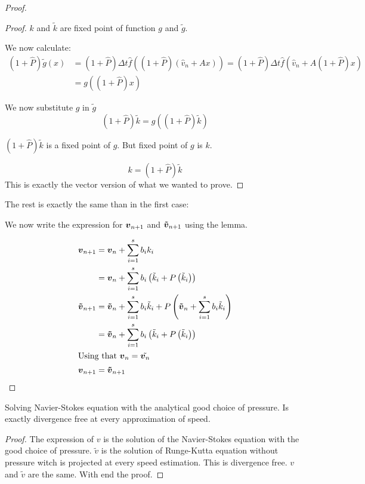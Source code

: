 \begin{proof}
\begin{proof}
$k$ and $\tilde{k}$ are fixed point of function $g$ and $\tilde{g}$.

We now calculate:
\begin{align}
(1+\hat{P})\tilde{g}(x)&=(1+\hat{P})\Delta t \hat{f}((1+\hat{P})(\hat{v}_{n}+Ax))=(1+\hat{P})\Delta t \hat{f}(\hat{v}_{n}+A (1+\hat{P})x)\\
&=g((1+\hat{P})x)
\end{align}

We now substitute $g$ in $\tilde{g}$
\begin{equation}
(1+\hat{P})\tilde{k}=g((1+\hat{P})\tilde{k})
\end{equation}

$(1+\hat{P})\tilde{k}$ is a fixed point of $g$.
But fixed point of $g$ is $k$.

\begin{equation}
k=(1+\hat{P})\tilde{k}
\end{equation}
This is exactly the vector version of what we wanted to prove.
\end{proof}

The rest is exactly the same than in the first case:

We now write the expression for ${\boldsymbol {v}}_{n+1}$ and ${\boldsymbol {\tilde{v}}}_{n+1}$ using the lemma.

\begin{align*}
{\boldsymbol {v}}_{n+1}&={\boldsymbol {v}}_{n}+\sum_{i=1}^{s}b_{i}k_{i}\\
&={\boldsymbol {v}}_{n}+\sum_{i=1}^{s}b_{i}\left(\tilde{k}_{i}+P\left(\tilde{k}_{i}\right)\right)\\
{\boldsymbol {\tilde{v}}}_{n+1}&={\boldsymbol {\tilde{v}}}_{n}+\sum_{i=1}^{s}b_{i}\tilde{k}_{i}+P\left({\boldsymbol {\tilde{v}}}_{n}+\sum_{i=1}^{s}b_{i}\tilde{k}_{i}\right)\\
&={\boldsymbol {\tilde{v}}}_{n}+\sum_{i=1}^{s}b_{i}\left(\tilde{k}_{i}+P\left(\tilde{k}_{i}\right)\right)\\
\intertext{Using that ${\boldsymbol {v}}_{n}=\tilde{{\boldsymbol {v}}_{n}}$}
{\boldsymbol {v}}_{n+1}&={\boldsymbol {\tilde{v}}}_{n+1}
\end{align*}

\end{proof}

\begin{cor}
Solving Navier-Stokes equation with the analytical good choice of pressure.
Is exactly divergence free at every approximation of speed.
\end{cor}
\begin{proof}
  The expression of $v$ is the solution of the Navier-Stokes equation with the good choice of pressure.
  $\tilde{v}$ is the solution of Runge-Kutta equation without pressure witch is projected at every speed estimation.
  This is divergence free.
  $v$ and $\tilde{v}$ are the same. With end the proof.
\end{proof}

